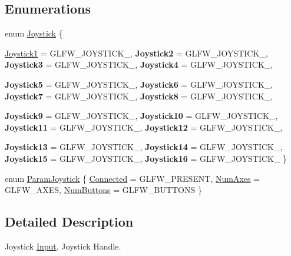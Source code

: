 \subsection*{Enumerations}
\begin{DoxyCompactItemize}
\item 
enum \hyperlink{namespace_f2_c_1_1_joystick_event_ada0230f460f765718db17ac021cbfc1f}{Joystick} \{ \par
\hyperlink{namespace_f2_c_1_1_joystick_event_ada0230f460f765718db17ac021cbfc1fa4034419a862baa7e71c2daafe7811546}{Joystick1} =  GLFW\_\-JOYSTICK\_, 
{\bfseries Joystick2} =  GLFW\_\-JOYSTICK\_, 
{\bfseries Joystick3} =  GLFW\_\-JOYSTICK\_, 
{\bfseries Joystick4} =  GLFW\_\-JOYSTICK\_, 
\par
{\bfseries Joystick5} =  GLFW\_\-JOYSTICK\_, 
{\bfseries Joystick6} =  GLFW\_\-JOYSTICK\_, 
{\bfseries Joystick7} =  GLFW\_\-JOYSTICK\_, 
{\bfseries Joystick8} =  GLFW\_\-JOYSTICK\_, 
\par
{\bfseries Joystick9} =  GLFW\_\-JOYSTICK\_, 
{\bfseries Joystick10} =  GLFW\_\-JOYSTICK\_, 
{\bfseries Joystick11} =  GLFW\_\-JOYSTICK\_, 
{\bfseries Joystick12} =  GLFW\_\-JOYSTICK\_, 
\par
{\bfseries Joystick13} =  GLFW\_\-JOYSTICK\_, 
{\bfseries Joystick14} =  GLFW\_\-JOYSTICK\_, 
{\bfseries Joystick15} =  GLFW\_\-JOYSTICK\_, 
{\bfseries Joystick16} =  GLFW\_\-JOYSTICK\_
 \}
\item 
enum \hyperlink{namespace_f2_c_1_1_joystick_event_ae71fc0f92f6dd24cc1ffe1bd14b6ed82}{ParamJoystick} \{ \hyperlink{namespace_f2_c_1_1_joystick_event_ae71fc0f92f6dd24cc1ffe1bd14b6ed82a6075441378e3a6b749817a8db0f0776e}{Connected} =  GLFW\_\-PRESENT, 
\hyperlink{namespace_f2_c_1_1_joystick_event_ae71fc0f92f6dd24cc1ffe1bd14b6ed82a53cdaff3a4d8928488b7ac6bee4a91a3}{NumAxes} =  GLFW\_\-AXES, 
\hyperlink{namespace_f2_c_1_1_joystick_event_ae71fc0f92f6dd24cc1ffe1bd14b6ed82a1a8d4120a6c283ece8cd39569fb94f9e}{NumButtons} =  GLFW\_\-BUTTONS
 \}
\end{DoxyCompactItemize}


\subsection{Detailed Description}
Joystick \hyperlink{class_f2_c_1_1_input}{Input}. Joystick Handle. 

